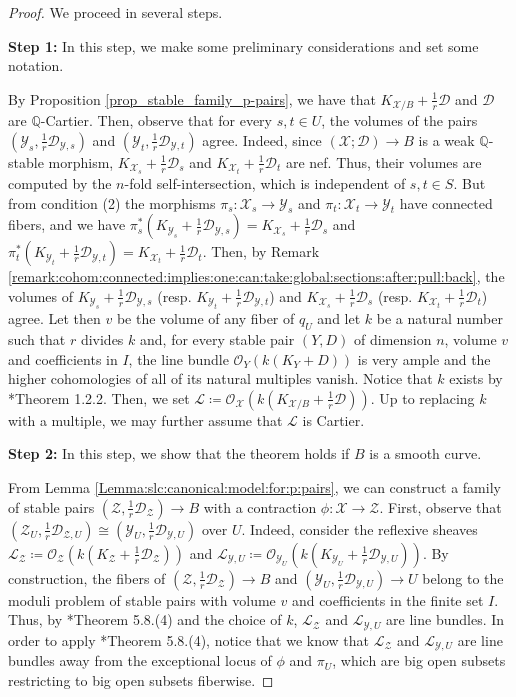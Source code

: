 \documentclass{amsart}
\newcommand{\bQ}{\mathbb{Q}}
\newcommand{\cD}{\mathcal{D}}
\newcommand{\cL}{\mathcal{L}}
\newcommand{\cO}{\mathcal{O}}
\newcommand{\cX}{\mathcal{X}}
\newcommand{\cY}{\mathcal{Y}}
\newcommand{\cZ}{\mathcal{Z}}
\theoremstyle{definition}
\newcommand{\rar}{\rightarrow}
\def\O#1.{\mathcal {O}_{#1}}
\def\K#1.{K_{#1}}
\def\subs#1.{_{#1}}
\renewcommand{\qq}{\mathbb{Q}}
\begin{document}
\begin{proof}
We proceed in several steps.

{\bf Step 1:} In this step, we make some preliminary considerations and set some notation.

By Proposition \ref{prop_stable_family_p-pairs}, we have that $\K \cX/B. + \frac{1}{r}\cD$ and $\cD$ are $\qq$-Cartier.
Then, observe that for every $s,t\in U$, the volumes of the pairs $(\cY_s,\frac{1}{r}\cD_{\cY,s})$ and $(\cY_t,\frac{1}{r}\cD_{\cY,t})$ agree.
Indeed, since $(\cX;\cD)\to B$ is a weak $\bQ$-stable morphism, $\K \cX_s.+ \frac{1}{r}\cD_s$ and $\K \cX_t.+ \frac{1}{r}\cD_t$ are nef.
Thus, their volumes are computed by the $n$-fold self-intersection, which is independent of $s,t \in S$.
But from condition (2) the morphisms $\pi_s \colon \cX_s\to \cY_s$ and $\pi_t \colon \cX_t\to \cY_t$ have connected
fibers, and we have $\pi_s^*(\K \cY_s. + \frac{1}{r}\cD \subs \cY,s.)=\K \cX_s. +\frac{1}{r} \cD_s$ and $\pi_t^*(\K \cY_t. +\frac{1}{r} \cD \subs \cY,t.)=\K \cX_t. +\frac{1}{r} \cD_t$.
Then, by Remark \ref{remark:cohom:connected:implies:one:can:take:global:sections:after:pull:back}, the volumes of $\K \cY_s. + \frac{1}{r}\cD \subs \cY,s.$ (resp. $\K \cY_t. + \frac{1}{r}\cD \subs \cY,t.$) and $\K \cX_s. +\frac{1}{r} \cD_s$ (resp. $\K \cX_t. + \frac{1}{r}\cD_t$) agree.
Let then $v$ be the volume of any fiber of $q_U$ and let $k$ be a natural number such that $r$ divides $k$ and, for every stable pair $(Y,D)$ of dimension $n$, volume $v$ and coefficients in $I$, the line bundle $\cO_Y(k(K_Y + D))$ is very ample and the higher cohomologies of all of its natural multiples vanish.
Notice that $k$ exists by \cite{HMX18}*{Theorem 1.2.2}.
Then, we set $\cL \coloneqq  \O \cX. (k(K_{\cX/B} + \frac{1}{r}\cD))$.
Up to replacing $k$ with a multiple, we may further assume that $\cL$ is Cartier.

{\bf Step 2:} In this step, we show that the theorem holds if $B$ is a smooth curve.

From Lemma \ref{Lemma:slc:canonical:model:for:p:pairs}, we can construct a family of stable pairs $(\cZ,\frac{1}{r}\cD_\cZ)\to B$ with a contraction $\phi \colon \cX\to \cZ$.
First, observe that $(\cZ_U,\frac{1}{r}\cD_{\cZ,U})\cong (\cY_U,\frac{1}{r}\cD_{\cY,U})$ over $U$.
Indeed, consider the reflexive sheaves $\cL _\cZ \coloneqq \O \cZ. (k(\K \cZ. + \frac{1}{r}\cD _\cZ))$ and $\cL _{\cY,U} \coloneqq \O \cY_U. (k(\K \cY_U. + \frac{1}{r}\cD _{\cY,U}))$.
By construction, the fibers of $(\cZ,\frac{1}{r}\cD_\cZ) \rar B$ and $(\cY_U,\frac{1}{r}\cD \subs \cY,U.) \rar U$ belong to the moduli problem of stable pairs with volume $v$ and coefficients in the finite set $I$.
Thus, by \cite{kol_new}*{Theorem 5.8.(4)} and the choice of $k$, $\cL _\cZ$ and $\cL _{\cY,U}$ are line bundles.
In order to apply \cite{kol_new}*{Theorem 5.8.(4)}, notice that we know that $\cL _\cZ$ and $\cL _{\cY,U}$ are line bundles away from the exceptional locus of $\phi$ and $\pi_U$, which are big open subsets restricting to big open subsets fiberwise.


\end{proof}
\end{document}
